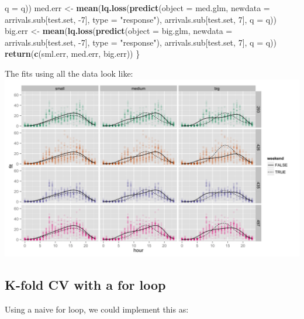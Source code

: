 \documentclass[]{article}
\newenvironment{Shaded}{\begin{snugshade}}{\end{snugshade}}
\newcommand{\KeywordTok}[1]{\textcolor[rgb]{0.13,0.29,0.53}{\textbf{{#1}}}}
\newcommand{\DataTypeTok}[1]{\textcolor[rgb]{0.13,0.29,0.53}{{#1}}}
\newcommand{\DecValTok}[1]{\textcolor[rgb]{0.00,0.00,0.81}{{#1}}}
\newcommand{\StringTok}[1]{\textcolor[rgb]{0.31,0.60,0.02}{{#1}}}
\newcommand{\NormalTok}[1]{{#1}}
\begin{document}
\begin{Shaded}
\begin{Highlighting}[]
                            \DataTypeTok{q =} \NormalTok{q))}
    \NormalTok{med.err <-}\StringTok{ }\KeywordTok{mean}\NormalTok{(}\KeywordTok{lq.loss}\NormalTok{(}\KeywordTok{predict}\NormalTok{(}\DataTypeTok{object =} \NormalTok{med.glm,}
                                    \DataTypeTok{newdata =} \NormalTok{arrivals.sub[test.set, -}\DecValTok{7}\NormalTok{],}
                                    \DataTypeTok{type =} \StringTok{"response"}\NormalTok{),}
                            \NormalTok{arrivals.sub[test.set, }\DecValTok{7}\NormalTok{],}
                            \DataTypeTok{q =} \NormalTok{q))}
    \NormalTok{big.err <-}\StringTok{ }\KeywordTok{mean}\NormalTok{(}\KeywordTok{lq.loss}\NormalTok{(}\KeywordTok{predict}\NormalTok{(}\DataTypeTok{object =} \NormalTok{big.glm,}
                                    \DataTypeTok{newdata =} \NormalTok{arrivals.sub[test.set, -}\DecValTok{7}\NormalTok{],}
                                    \DataTypeTok{type =} \StringTok{"response"}\NormalTok{),}
                            \NormalTok{arrivals.sub[test.set, }\DecValTok{7}\NormalTok{],}
                            \DataTypeTok{q =} \NormalTok{q))}
    \KeywordTok{return}\NormalTok{(}\KeywordTok{c}\NormalTok{(sml.err, med.err, big.err))}
\NormalTok{\}}
\end{Highlighting}
\end{Shaded}

The fits using all the data look like:
\includegraphics{./fig/fit_all.png}

\subsection{K-fold CV with a for loop}\label{k-fold-cv-with-a-for-loop}

Using a naive for loop, we could implement this as:
\end{document}
